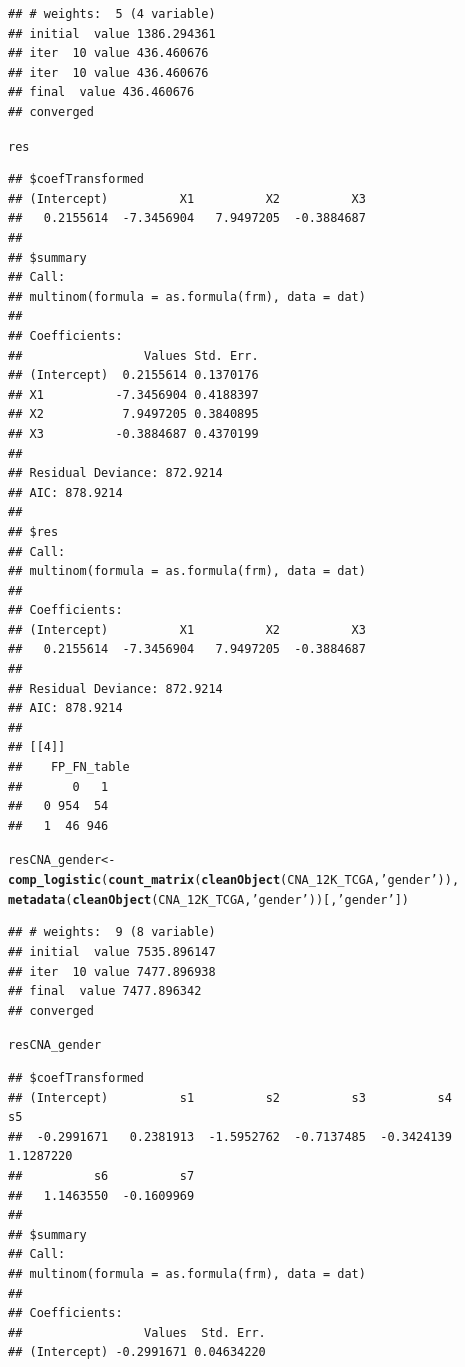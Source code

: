 \documentclass{article}\usepackage[]{graphicx}\usepackage[]{color}
\makeatletter
\newcommand{\hlstr}[1]{\textcolor[rgb]{0.192,0.494,0.8}{#1}}%
\newcommand{\hlstd}[1]{\textcolor[rgb]{0.345,0.345,0.345}{#1}}%
\newcommand{\hlkwb}[1]{\textcolor[rgb]{0.69,0.353,0.396}{#1}}%
\newcommand{\hlkwd}[1]{\textcolor[rgb]{0.737,0.353,0.396}{\textbf{#1}}}%
\newenvironment{kframe}{%
 \def\at@end@of@kframe{}%
 \ifinner\ifhmode%
  \def\at@end@of@kframe{\end{minipage}}%
  \begin{minipage}{\columnwidth}%
 \fi\fi%
 \def\FrameCommand##1{\hskip\@totalleftmargin \hskip-\fboxsep
 \colorbox{shadecolor}{##1}\hskip-\fboxsep
     \hskip-\linewidth \hskip-\@totalleftmargin \hskip\columnwidth}%
 \MakeFramed {\advance\hsize-\width
   \@totalleftmargin\z@ \linewidth\hsize
   \@setminipage}}%
 {\par\unskip\endMakeFramed%
 \at@end@of@kframe}
\newenvironment{knitrout}{}{} %
\makeatother
\begin{document}
\begin{knitrout}
\begin{kframe}
{\ttfamily\noindent\itshape\color{messagecolor}{\#\# Loading required package: nnet}}\begin{verbatim}
## # weights:  5 (4 variable)
## initial  value 1386.294361 
## iter  10 value 436.460676
## iter  10 value 436.460676
## final  value 436.460676 
## converged
\end{verbatim}
\begin{alltt}
\hlstd{res}
\end{alltt}
\begin{verbatim}
## $coefTransformed
## (Intercept)          X1          X2          X3 
##   0.2155614  -7.3456904   7.9497205  -0.3884687 
## 
## $summary
## Call:
## multinom(formula = as.formula(frm), data = dat)
## 
## Coefficients:
##                 Values Std. Err.
## (Intercept)  0.2155614 0.1370176
## X1          -7.3456904 0.4188397
## X2           7.9497205 0.3840895
## X3          -0.3884687 0.4370199
## 
## Residual Deviance: 872.9214 
## AIC: 878.9214 
## 
## $res
## Call:
## multinom(formula = as.formula(frm), data = dat)
## 
## Coefficients:
## (Intercept)          X1          X2          X3 
##   0.2155614  -7.3456904   7.9497205  -0.3884687 
## 
## Residual Deviance: 872.9214 
## AIC: 878.9214 
## 
## [[4]]
##    FP_FN_table
##       0   1
##   0 954  54
##   1  46 946
\end{verbatim}
\begin{alltt}
\hlstd{resCNA_gender} \hlkwb{<-} \hlkwd{comp_logistic}\hlstd{(}\hlkwd{count_matrix}\hlstd{(}\hlkwd{cleanObject}\hlstd{(CNA_12K_TCGA,} \hlstr{'gender'}\hlstd{)),}
                              \hlkwd{metadata}\hlstd{(}\hlkwd{cleanObject}\hlstd{(CNA_12K_TCGA,} \hlstr{'gender'}\hlstd{))[,}\hlstr{'gender'}\hlstd{])}
\end{alltt}
\begin{verbatim}
## # weights:  9 (8 variable)
## initial  value 7535.896147 
## iter  10 value 7477.896938
## final  value 7477.896342 
## converged
\end{verbatim}
\begin{alltt}
\hlstd{resCNA_gender}
\end{alltt}
\begin{verbatim}
## $coefTransformed
## (Intercept)          s1          s2          s3          s4          s5 
##  -0.2991671   0.2381913  -1.5952762  -0.7137485  -0.3424139   1.1287220 
##          s6          s7 
##   1.1463550  -0.1609969 
## 
## $summary
## Call:
## multinom(formula = as.formula(frm), data = dat)
## 
## Coefficients:
##                 Values  Std. Err.
## (Intercept) -0.2991671 0.04634220

\end{verbatim}
\end{kframe}
\end{knitrout}
\end{document}
